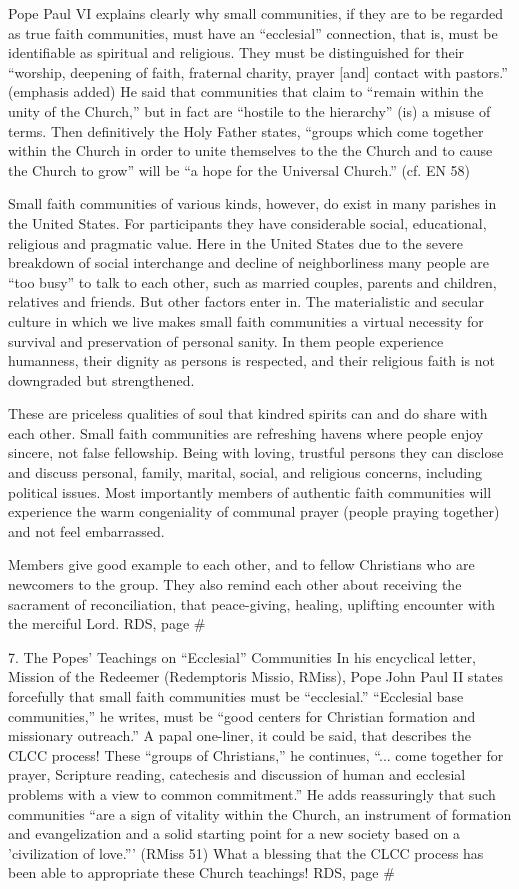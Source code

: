 \documentclass[oneside]{book}
\begin{document}
Pope Paul VI explains clearly why small communities, if they are to be regarded
as true faith communities, must have an ``ecclesial'' connection, that is, must
be identifiable as spiritual and religious. They must be distinguished for their
``worship, deepening of faith, fraternal charity, prayer [and] contact with
pastors.'' (emphasis added) He said that communities that claim to ``remain
within the unity of the Church,'' but in fact are ``hostile to the hierarchy''
(is) a misuse of terms. Then definitively the Holy Father states, ``groups
which come together within the Church in order to unite themselves to the the
Church and to cause the Church to grow'' will be ``a hope for the Universal
Church.''  (cf. EN 58)

Small faith communities of various kinds, however, do exist in many parishes in
the United States. For participants they have considerable social, educational,
religious and pragmatic value. Here in the United States due to the severe
breakdown of social interchange and decline of neighborliness many people are
``too busy'' to talk to each other, such as married couples, parents and
children, relatives and friends. But other factors enter in. The materialistic
and secular culture in which we live makes small faith communities a virtual
necessity for survival and preservation of personal sanity. In them people
experience humanness, their dignity as persons is respected, and their religious
faith is not downgraded but strengthened.

These are priceless qualities of soul that kindred spirits can and do share with
each other. Small faith communities are refreshing havens where people enjoy
sincere, not false fellowship. Being with loving, trustful persons they can
disclose and discuss personal, family, marital, social, and religious concerns,
including political issues. Most importantly members of authentic faith
communities will experience the warm congeniality of communal prayer (people
praying together) and not feel embarrassed.

Members give good example to each other, and to fellow Christians who are
newcomers to the group. They also remind each other about receiving the
sacrament of reconciliation, that peace-giving, healing, uplifting encounter
with the merciful Lord.
RDS, page \#

7. The Popes' Teachings on ``Ecclesial'' Communities
In his encyclical letter, Mission of the Redeemer (Redemptoris Missio, RMiss),
Pope John Paul II states forcefully that small faith communities must be
``ecclesial.'' ``Ecclesial base communities,'' he writes, must be ``good centers
for Christian formation and missionary outreach.'' A papal one-liner, it could
be said, that describes the CLCC process! These ``groups of Christians,'' he
continues, ``... come together for prayer, Scripture reading, catechesis and
discussion of human and ecclesial problems with a view to common commitment.''
He adds reassuringly that such communities ``are a sign of vitality within the
Church, an instrument of formation and evangelization and a solid starting point
for a new society based on a 'civilization of love.''' (RMiss 51) What a
blessing that the CLCC process has been able to appropriate these Church
teachings!
RDS, page \#
\end{document}

